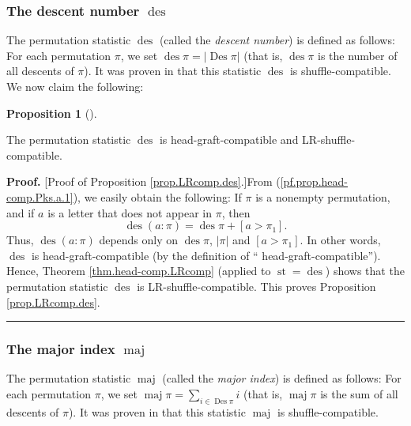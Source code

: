 \documentclass[numbers=enddot,12pt,final,onecolumn,notitlepage]{scrartcl}%
\theoremstyle{definition}
\newtheorem{prop}[theo]{Proposition}
\newenvironment{proposition}[1][]
{\begin{prop}[#1]\begin{leftbar}}
{\end{leftbar}\end{prop}}
\newenvironment{proof}[1][Proof]{\noindent\textbf{#1.} }{\ \rule{0.5em}{0.5em}}
\let\sumnonlimits\sum
\renewcommand{\sum}{\sumnonlimits\limits}
\begin{document}
\subsubsection{The descent number $\operatorname*{des}$}

The permutation statistic $\operatorname*{des}$ (called the \textit{descent
number}) is defined as follows: For each permutation $\pi$, we set
$\operatorname*{des}\pi=\left\vert \operatorname*{Des}\pi\right\vert $ (that
is, $\operatorname*{des}\pi$ is the number of all descents of $\pi$). It was
proven in \cite[Theorem 4.6 \textbf{(a)}]{part1} that this statistic
$\operatorname*{des}$ is shuffle-compatible. We now claim the following:

\begin{proposition}
\label{prop.LRcomp.des}The permutation statistic $\operatorname*{des}$ is
head-graft-compatible and LR-shuffle-compatible.
\end{proposition}

\begin{proof}
[Proof of Proposition \ref{prop.LRcomp.des}.]From
(\ref{pf.prop.head-comp.Pks.a.1}), we easily obtain the following: If $\pi$ is
a nonempty permutation, and if $a$ is a letter that does not appear in $\pi$,
then%
\[
\operatorname*{des}\left(  a:\pi\right)  =\operatorname*{des}\pi+\left[
a>\pi_{1}\right]  .
\]
Thus, $\operatorname*{des}\left(  a:\pi\right)  $ depends only on
$\operatorname*{des}\pi$, $\left\vert \pi\right\vert $ and $\left[  a>\pi
_{1}\right]  $. In other words, $\operatorname*{des}$ is head-graft-compatible
(by the definition of \textquotedblleft
head-graft-compatible\textquotedblright). Hence, Theorem
\ref{thm.head-comp.LRcomp} (applied to $\operatorname*{st}=\operatorname*{des}%
$) shows that the permutation statistic $\operatorname*{des}$ is
LR-shuffle-compatible. This proves Proposition \ref{prop.LRcomp.des}.
\end{proof}

\subsubsection{The major index $\operatorname*{maj}$}

The permutation statistic $\operatorname*{maj}$ (called the \textit{major
index}) is defined as follows: For each permutation $\pi$, we set
$\operatorname*{maj}\pi=\sum_{i\in\operatorname*{Des}\pi}i$ (that is,
$\operatorname*{maj}\pi$ is the sum of all descents of $\pi$). It was proven
in \cite[Theorem 3.1 \textbf{(a)}]{part1} that this statistic
$\operatorname*{maj}$ is shuffle-compatible.
\end{document}
